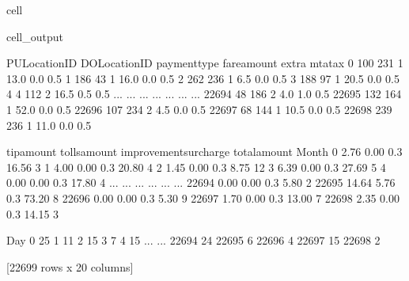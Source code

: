 \documentclass[letterpaper,10pt,english]{sphinxmanual}
\begin{document}
\begin{sphinxuseclass}{cell}
\begin{sphinxuseclass}{cell_output}
\begin{sphinxVerbatim}[commandchars=\\\{\}]
       PULocationID  DOLocationID  payment\PYGZus{}type  fare\PYGZus{}amount  extra  mta\PYGZus{}tax  \PYGZbs{}
0               100           231             1         13.0    0.0      0.5   
1               186            43             1         16.0    0.0      0.5   
2               262           236             1          6.5    0.0      0.5   
3               188            97             1         20.5    0.0      0.5   
4                 4           112             2         16.5    0.5      0.5   
...             ...           ...           ...          ...    ...      ...   
22694            48           186             2          4.0    1.0      0.5   
22695           132           164             1         52.0    0.0      0.5   
22696           107           234             2          4.5    0.0      0.5   
22697            68           144             1         10.5    0.0      0.5   
22698           239           236             1         11.0    0.0      0.5   

       tip\PYGZus{}amount  tolls\PYGZus{}amount  improvement\PYGZus{}surcharge  total\PYGZus{}amount  Month  \PYGZbs{}
0            2.76          0.00                    0.3         16.56      3   
1            4.00          0.00                    0.3         20.80      4   
2            1.45          0.00                    0.3          8.75     12   
3            6.39          0.00                    0.3         27.69      5   
4            0.00          0.00                    0.3         17.80      4   
...           ...           ...                    ...           ...    ...   
22694        0.00          0.00                    0.3          5.80      2   
22695       14.64          5.76                    0.3         73.20      8   
22696        0.00          0.00                    0.3          5.30      9   
22697        1.70          0.00                    0.3         13.00      7   
22698        2.35          0.00                    0.3         14.15      3   

       Day  
0       25  
1       11  
2       15  
3        7  
4       15  
...    ...  
22694   24  
22695    6  
22696    4  
22697   15  
22698    2  

[22699 rows x 20 columns]
\end{sphinxVerbatim}

\end{sphinxuseclass}
\end{sphinxuseclass}
\sphinxAtStartPar
{}
\end{document}
